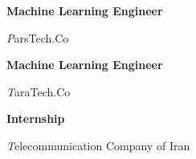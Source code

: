 \begin{rubric}{}

\entry*[2021 -- present]%
	\textbf{Machine Learning Engineer} \par {\emph ParsTech.Co}

\entry*[2020 -- 2021]%
	\textbf{Machine Learning Engineer} \par {\emph TaraTech.Co}

\entry*[2019 -- 2020]%
	\textbf{Internship} \par {\emph Telecommunication Company of Iran} 


\end{rubric}